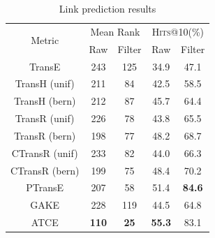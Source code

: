 \begin{table} %
 \centering
  \caption{Link prediction results}
  \label{table_link_prediction_results}
  \begin{tabular}{c|cc|cc}
    \hline
    \multirow{2}{*}{Metric}  & \multicolumn{2}{c|}{Mean Rank} & \multicolumn{2}{c}{\textsc{Hits}@10(\%)} \\
                             & Raw          & Filter          & Raw           & Filter          \\
    \hline
    TransE                   & 243          & 125             & 34.9          & 47.1            \\
    TransH (unif)            & 211          & 84              & 42.5          & 58.5            \\
    TransH (bern)            & 212          & 87              & 45.7          & 64.4            \\
    TransR (unif)            & 226          & 78              & 43.8          & 65.5            \\
    TransR (bern)            & 198          & 77              & 48.2          & 68.7            \\
    CTransR (unif)           & 233          & 82              & 44.0          & 66.3            \\
    CTransR (bern)           & 199          & 75              & 48.4          & 70.2            \\
    PTransE                  & 207          & 58              & 51.4          & \textbf{84.6}   \\
    GAKE                     & 228          & 119             & 44.5          & 64.8            \\
    \hline
    ATCE                      & \textbf{110} & \textbf{25}     & \textbf{55.3} & 83.1            \\
    \hline
  \end{tabular}
\end{table}

